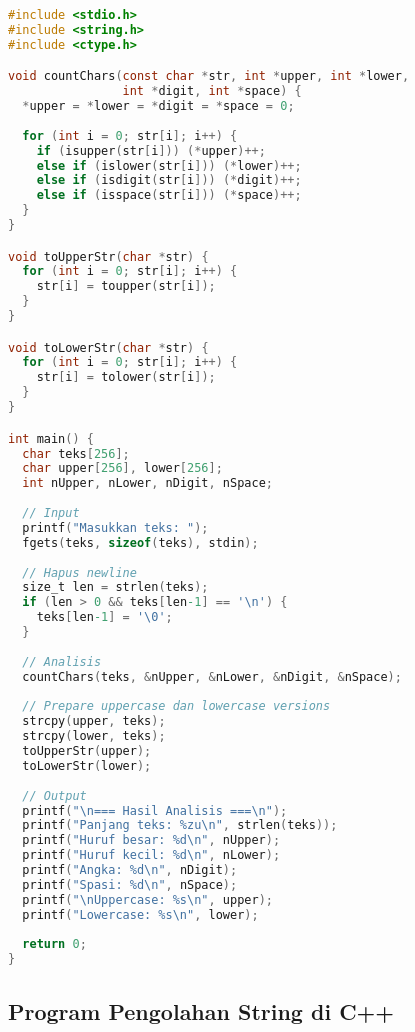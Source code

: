 \documentclass[../main.tex]{subfiles}
\begin{document}
\begin{lstlisting}[language=C, caption={Program manipulasi string di C}]
#include <stdio.h>
#include <string.h>
#include <ctype.h>

void countChars(const char *str, int *upper, int *lower, 
                int *digit, int *space) {
  *upper = *lower = *digit = *space = 0;
  
  for (int i = 0; str[i]; i++) {
    if (isupper(str[i])) (*upper)++;
    else if (islower(str[i])) (*lower)++;
    else if (isdigit(str[i])) (*digit)++;
    else if (isspace(str[i])) (*space)++;
  }
}

void toUpperStr(char *str) {
  for (int i = 0; str[i]; i++) {
    str[i] = toupper(str[i]);
  }
}

void toLowerStr(char *str) {
  for (int i = 0; str[i]; i++) {
    str[i] = tolower(str[i]);
  }
}

int main() {
  char teks[256];
  char upper[256], lower[256];
  int nUpper, nLower, nDigit, nSpace;
  
  // Input
  printf("Masukkan teks: ");
  fgets(teks, sizeof(teks), stdin);
  
  // Hapus newline
  size_t len = strlen(teks);
  if (len > 0 && teks[len-1] == '\n') {
    teks[len-1] = '\0';
  }
  
  // Analisis
  countChars(teks, &nUpper, &nLower, &nDigit, &nSpace);
  
  // Prepare uppercase dan lowercase versions
  strcpy(upper, teks);
  strcpy(lower, teks);
  toUpperStr(upper);
  toLowerStr(lower);
  
  // Output
  printf("\n=== Hasil Analisis ===\n");
  printf("Panjang teks: %zu\n", strlen(teks));
  printf("Huruf besar: %d\n", nUpper);
  printf("Huruf kecil: %d\n", nLower);
  printf("Angka: %d\n", nDigit);
  printf("Spasi: %d\n", nSpace);
  printf("\nUppercase: %s\n", upper);
  printf("Lowercase: %s\n", lower);
  
  return 0;
}
\end{lstlisting}

\subsection{Program Pengolahan String di C++}
\end{document}
